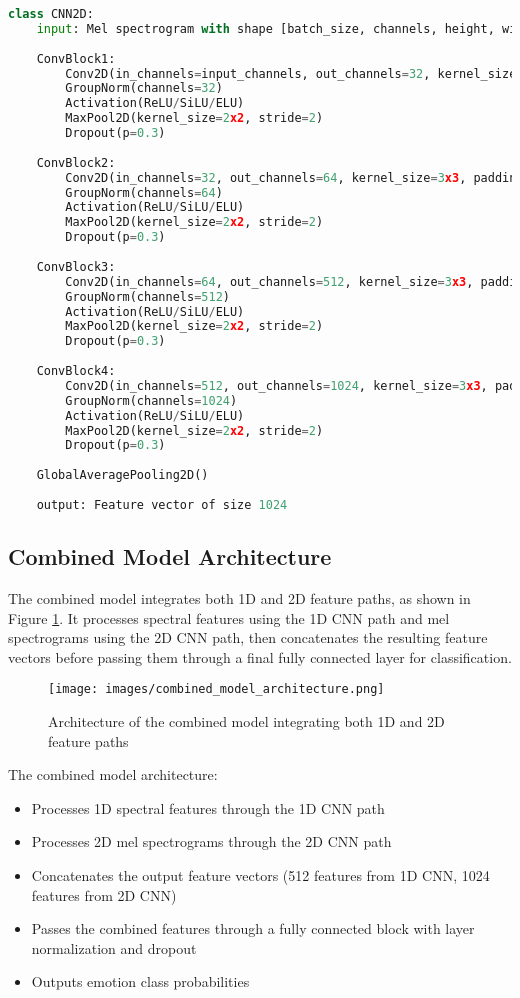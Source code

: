 \begin{lstlisting}[language=Python, style=pseudocode, caption=2D CNN Architecture (Pseudocode)]
class CNN2D:
    input: Mel spectrogram with shape [batch_size, channels, height, width]
    
    ConvBlock1:
        Conv2D(in_channels=input_channels, out_channels=32, kernel_size=3x3, padding=1)
        GroupNorm(channels=32)
        Activation(ReLU/SiLU/ELU)
        MaxPool2D(kernel_size=2x2, stride=2)
        Dropout(p=0.3)
    
    ConvBlock2:
        Conv2D(in_channels=32, out_channels=64, kernel_size=3x3, padding=1)
        GroupNorm(channels=64)
        Activation(ReLU/SiLU/ELU)
        MaxPool2D(kernel_size=2x2, stride=2)
        Dropout(p=0.3)
    
    ConvBlock3:
        Conv2D(in_channels=64, out_channels=512, kernel_size=3x3, padding=1)
        GroupNorm(channels=512)
        Activation(ReLU/SiLU/ELU)
        MaxPool2D(kernel_size=2x2, stride=2)
        Dropout(p=0.3)
    
    ConvBlock4:
        Conv2D(in_channels=512, out_channels=1024, kernel_size=3x3, padding=1)
        GroupNorm(channels=1024)
        Activation(ReLU/SiLU/ELU)
        MaxPool2D(kernel_size=2x2, stride=2)
        Dropout(p=0.3)
    
    GlobalAveragePooling2D()
    
    output: Feature vector of size 1024
\end{lstlisting}

\subsection{Combined Model Architecture}

The combined model integrates both 1D and 2D feature paths, as shown in Figure \ref{fig:combined_model}. It processes spectral features using the 1D CNN path and mel spectrograms using the 2D CNN path, then concatenates the resulting feature vectors before passing them through a final fully connected layer for classification.

\begin{figure}[h]
    \centering
    \texttt{[image: images/combined\_model\_architecture.png]}
    \caption{Architecture of the combined model integrating both 1D and 2D feature paths}
    \label{fig:combined_model}
\end{figure}

The combined model architecture:
\begin{itemize}
    \item Processes 1D spectral features through the 1D CNN path
    \item Processes 2D mel spectrograms through the 2D CNN path
    \item Concatenates the output feature vectors (512 features from 1D CNN, 1024 features from 2D CNN)
    \item Passes the combined features through a fully connected block with layer normalization and dropout
    \item Outputs emotion class probabilities
\end{itemize}


